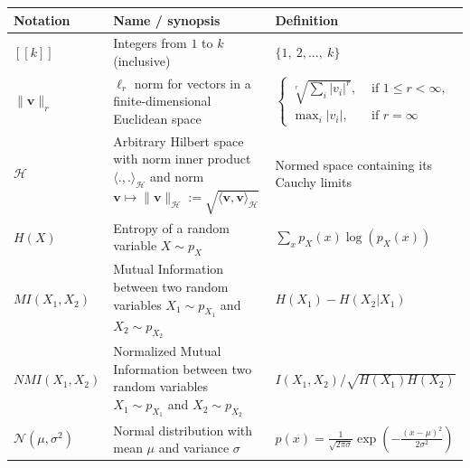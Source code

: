 \documentclass[nobib, a4paper, notoc, twoside, justified, openany]{tufte-book}
\providecommand{\B}[1]{\mathbf{#1}}
\def\v{\mathbf{v}}
\begin{document}
\begin{fullwidth}
\def\arraystretch{1.5}
\begin{longtable}{p{2cm} | p{6cm} | p{9cm}}
\cmidrule{1-3}
Notation & Name / synopsis & Definition\\ 
  \midrule
  $[\![k]\!]$ & Integers from $1$ to $k$ (inclusive) & $\{1,~2, \ldots,~k \}$ \\
  $\| \B{v} \|_r$ & $\ell_r$ norm for vectors in  a finite-dimensional Euclidean space & $\begin{cases}\sqrt[r]{\sum_i |v_i|^r},&\mbox{ if }1 \le r < \infty,\\\max_{i}|v_i|,&\mbox { if }r = \infty\end{cases}$ \\
  $\mathcal H$ & Arbitrary Hilbert space with norm inner product $\langle .,.\rangle_{\mathcal H}$ and norm $\v \mapsto \|\v\|_{\mathcal H} := \sqrt{\langle \v,\v\rangle_{\mathcal H}}$& Normed space containing its Cauchy limits\\
$H(X)$ & Entropy of a random variable $X \sim p_X$ & $\sum_{x}p_{X}(x)\log(p_{X}(x))$\\
$MI(X_1,X_2)$ & Mutual Information between two random variables $X_1 \sim p_{X_1}$ and $X_2 \sim p_{X_2}$ & 
$ H(X_1) - H(X_2|X_1)$\\

 $NMI(X_1,X_2)$ & Normalized Mutual Information between two random variables $X_1 \sim p_{X_1}$ and $X_2 \sim p_{X_2}$ & $I(X_1,X_2)/\sqrt{H(X_1)H(X_2)}$ \\
  $\mathcal{N}(\mu, \sigma^2)$ & Normal distribution with mean $\mu$ and variance $\sigma$ & $p(x) = \frac{1}{\sqrt{2\pi\sigma}}
                                                                                             \exp\left(-\frac{(x-\mu)^2}{2\sigma^2}\right)$\\


\end{longtable}
\end{fullwidth}
\end{document}
